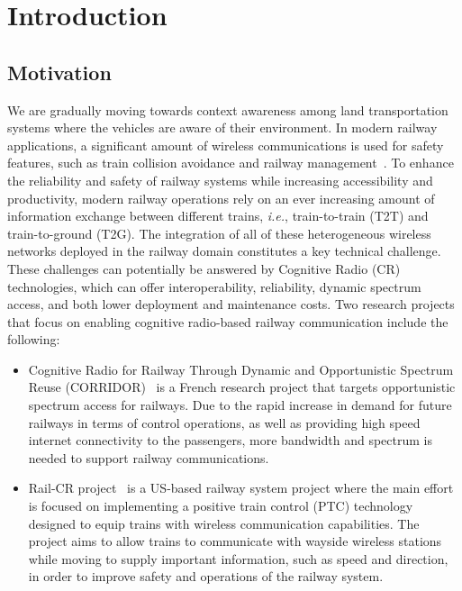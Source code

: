 \chapter{Introduction}
\label{ch:introduction}
\section{Motivation}
We are gradually moving towards context awareness among land transportation systems where the vehicles are aware of their environment. In modern railway applications, a significant amount of wireless communications is used for safety features, such as train collision avoidance and railway management~\cite{trlter2}. To enhance the reliability and safety of railway systems while increasing accessibility and productivity, modern railway operations rely on an ever increasing amount of information exchange between different trains, \textit{i.e.}, train-to-train (T2T) and train-to-ground (T2G). The integration of all of these heterogeneous wireless networks deployed in the railway domain constitutes a key technical challenge. These challenges can potentially be answered by Cognitive Radio (CR) technologies, which can offer interoperability, reliability, dynamic spectrum access, and both lower deployment and maintenance costs. Two research projects that focus on enabling cognitive radio-based railway communication include the following:

\begin{itemize}

\item Cognitive Radio for Railway Through Dynamic and Opportunistic Spectrum Reuse (CORRIDOR)~\cite{corridor} is a French research project that targets opportunistic spectrum access for railways. Due to the rapid increase in demand for future railways in terms of control operations, as well as providing high speed internet connectivity to the passengers, more bandwidth and spectrum is needed to support railway communications.

\item Rail-CR project~\cite{5621621} is a US-based railway system project where the main effort is focused on implementing a positive train control (PTC) technology designed to equip trains with wireless communication capabilities. The project aims to allow trains to communicate with wayside wireless stations while moving to supply important information, such as speed and direction, in order to improve safety and operations of the railway system.

\end{itemize}

